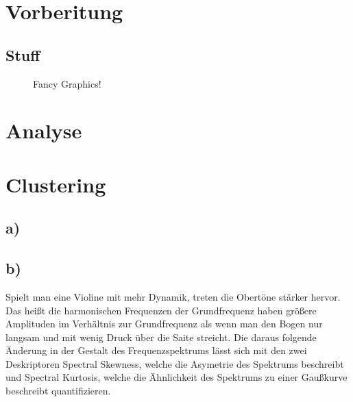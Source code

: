 

\section{Vorberitung}
\label{sec:preperation}

\subsection{Stuff}
\begin{figure}[H]
    \center
    \caption{Fancy Graphics!}
    \label{fig:im}
\end{figure}




\section{Analyse}
\label{sec:analyse}




\section{Clustering}
\label{sec:cluster}
\subsection{a)}
\subsection{b)}
Spielt man eine Violine mit mehr Dynamik, treten die Obertöne stärker hervor.
Das heißt die harmonischen Frequenzen der Grundfrequenz haben größere Amplituden im Verhältnis zur Grundfrequenz als wenn man den Bogen nur langsam und mit wenig Druck über die Saite streicht.  
Die daraus folgende Änderung in der Gestalt des Frequenzspektrums lässt sich mit den zwei Deskriptoren Spectral Skewness, welche die Asymetrie des Spektrums beschreibt und Spectral Kurtosis, welche die Ähnlichkeit des Spektrums zu einer Gaußkurve beschreibt quantifizieren. 
 